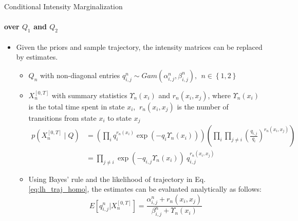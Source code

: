 \documentclass[
english,%
aspectratio=169,%
color={accentcolor=3b},
logo=true,%
colorframetitle=false,%
]{tudabeamer}
\begin{document}
\begin{frame}{Conditional Intensity Marginalization}
\framesubtitle{over $ Q_{1} $ and $ Q_{2} $}
\begin{itemize}
\item Given the priors and sample trajectory, the intensity matrices can be replaced by estimates. \cite{Studer2016}
\begin{itemize}
\item $Q_{n}$ with non-diagonal entries $ q^{n}_{i, j}\sim Gam(\alpha^{n}_{i, j}, \beta^{n}_{i, j}),\ \ n \in \left\lbrace 1,2\right\rbrace $
\item $X_{n}^{[0,T]}$ with summary statistics $ \Upsilon_{n}(x_i) $ and $ r_{n}(x_i,x_j) $, where $ \Upsilon_{n}(x_i) $ is the total time spent in state $ x_i $, $\ r_{n}(x_i,x_j) $ is the number of transitions from state $ x_i $ to state $ x_j $
\begin{align}
p(X_n^{[0,T]}  \mid Q) &=\left(\prod_{ i} q_{i}^{r_n(x_{i})} \exp \left(-q_{i} \Upsilon_n(x_{i})\right)\right)\left(\prod_{ i} \prod_{ j \neq i} \left(\frac{q_{i,j}}{q_{i}}\right)^{r_n(x_{i}, x_{j})}\right) \nonumber\\ & = \prod_{j \neq i}  \exp(-q_{i,j}\Upsilon_n(x_{i}))\ q_{i,j}^{r_n(x_{i},x_{j})}
\label{eq:lh_traj_homo}
\end{align}
\item Using Bayes' rule and the likelihood of trajectory in Eq.\autoref{eq:lh_traj_homo}, the estimates can be evaluated analytically as follows:
\begin{equation}
E\left[ q^{n}_{i,j} | X_n^{[0,T]}\right]=\frac{\alpha^{n}_{i,j}+r_{n}(x_i, x_j)}{\beta^{n}_{i, j}+\Upsilon_{n}(x_i)}
\label{eq:Q_estimate}
\end{equation}
\end{itemize}
\end{itemize}
\end{frame}
\end{document}
